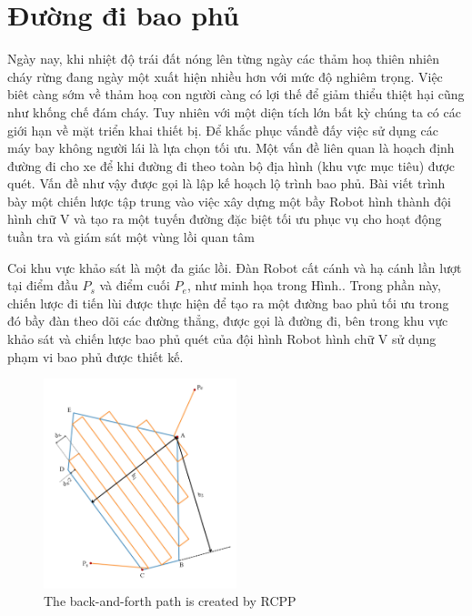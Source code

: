 \section{Đường đi bao phủ} 
Ngày nay, khi nhiệt độ trái đất nóng lên từng ngày các thảm hoạ thiên nhiên cháy rừng đang ngày một xuất hiện nhiều hơn với mức độ nghiêm trọng. Việc biêt càng sớm về thảm hoạ con người càng có lợi thế để giảm thiểu thiệt hại cũng như khống chế đám cháy. Tuy nhiên với một diện tích lớn bất kỳ chúng ta có các giới hạn về mặt triển khai thiết bị. Để khắc phục vấnđề đấy việc sử dụng các máy bay không người lái là lựa chọn tối ưu. Một vấn đề liên quan là hoạch định đường đi cho xe để khi đường đi theo toàn bộ địa hình (khu vực mục tiêu) được quét. Vấn đề như vậy được gọi là lập kế hoạch lộ trình bao phủ. Bài viết trình bày một chiến lược tập trung vào việc xây dựng một bầy Robot hình thành đội hình chữ V và tạo ra một tuyến đường đặc biệt tối ưu phục vụ cho hoạt động tuần tra và giám sát một vùng lồi quan tâm

Coi khu vực khảo sát là một đa giác lồi. Đàn Robot cất cánh và hạ cánh lần lượt tại điểm đầu $P_s$ và điểm cuối $P_e$, như minh họa trong Hình.. Trong phần này, chiến lược đi tiến lùi được thực hiện để tạo ra một đường bao phủ tối ưu trong đó bầy đàn theo dõi các đường thẳng, được gọi là đường đi, bên trong khu vực khảo sát và chiến lược bao phủ quét của đội hình Robot hình chữ V sử dụng phạm vi bao phủ được thiết kế.

    \begin{figure}[h]
        \centering
        \includegraphics[width=0.5\textwidth]{chapter4/image/sweepline.drawio.pdf}
        \caption{The back-and-forth path is created by RCPP}
        \label{fig:SW1}
    \end{figure}
